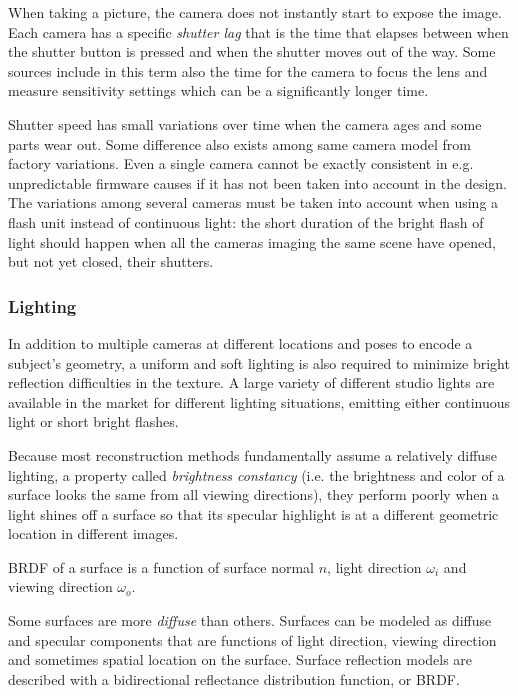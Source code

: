 When taking a picture, the camera does not instantly start to expose the image.
Each camera has a specific \emph{shutter lag} that is the time that elapses between when the shutter button is pressed and when the shutter moves out of the way.
Some sources include in this term also the time for the camera to focus the lens and measure sensitivity settings which can be a significantly longer time.

Shutter speed has small variations over time when the camera ages and some parts wear out.
Some difference also exists among same camera model from factory variations.
Even a single camera cannot be exactly consistent in e.g. unpredictable firmware causes if it has not been taken into account in the design.
The variations among several cameras must be taken into account when using a flash unit instead of continuous light: the short duration of the bright flash of light should happen when all the cameras imaging the same scene have opened, but not yet closed, their shutters.



\subsubsection{Lighting} %

In addition to multiple cameras at different locations and poses to encode a subject's geometry, a uniform and soft lighting is also required to minimize bright reflection difficulties in the texture.
A large variety of different studio lights are available in the market for different lighting situations, emitting either continuous light or short bright flashes.

Because most reconstruction methods fundamentally assume a relatively diffuse lighting, a property called \emph{brightness constancy} (i.e. the brightness and color of a surface looks the same from all viewing directions), they perform poorly when a light shines off a surface so that its specular highlight is at a different geometric location in different images.

{BRDF of a surface is a function of surface normal $n$, light direction $\omega_i$ and viewing direction $\omega_o$.}

Some surfaces are more \emph{diffuse} than others.
Surfaces can be modeled as diffuse and specular components that are functions of light direction, viewing direction and sometimes spatial location on the surface.
Surface reflection models are described with a bidirectional reflectance distribution function, or BRDF. \cite{nicodemus1965dirreflectanceetc}

